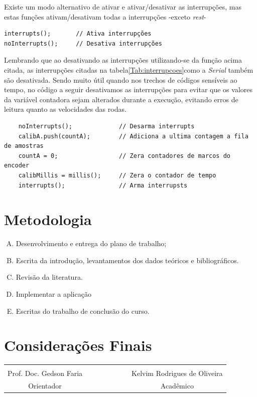 \documentclass[a4paper,12pt,portuguese]{ufms-cpcx}
\begin{document}
Existe um modo alternativo de ativar e ativar\//desativar as interrupções, mas estas funções ativam\//desativam todas a interrupções -exceto \textit{rest}-
\begin{lstlisting}
interrupts();		// Ativa interrupções
noInterrupts();		// Desativa interrupções
\end{lstlisting}
Lembrando que ao desativando as interrupções utilizando-se da função acima citada, as interrupções citadas na tabela\ref{Tab:interrupcoes}como a \textit{Serial} também são desativada. Sendo muito útil quando nos trechos de códigos sensíveis ao tempo, no código a seguir desativamos as interrupções para evitar que os valores da variável contadora sejam alterados durante a execução, evitando erros de leitura quanto as velocidades das rodas.
\begin{lstlisting}
	noInterrupts();				// Desarma interrupts
	calibA.push(countA);		// Adiciona a ultima contagem a fila de amostras
	countA = 0;					// Zera contadores de marcos do encoder
	calibMillis = millis();		// Zera o contador de tempo
	interrupts();				// Arma interrupsts
\end{lstlisting}

\chapter{Metodologia} \label{cap: metodologia}

\begin{enumerate}[(A)]
	
	\item Desenvolvimento e entrega do plano de trabalho;
	\item Escrita da introdução, levantamentos dos dados teóricos e bibliográficos.
	\item Revisão da literatura. 
	\item Implementar a aplicação
	\item Escritas do trabalho de conclusão do curso.		
	
	
\end{enumerate}

\chapter{Considerações Finais}


\vskip 10cm
\begin{table}[!h]
	\renewcommand{\arraystretch}{1.3}
	\centering
	\begin{tabular}{cccccccc}
		& & & & & & & \\
		Prof. Doc. Gedson Faria & & & & & & & Kelvim Rodrigues de Oliveira \\
		Orientador & & & & & & & Acadêmico \\
	\end{tabular}
\end{table}
\end{document}
